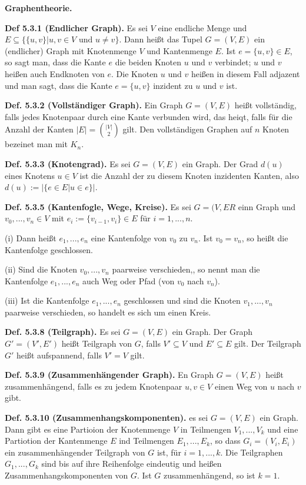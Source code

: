 \textbf{Graphentheorie.}

\textbf{Def 5.3.1 (Endlicher Graph).} Es sei $V$ eine endliche Menge und $E \subseteq \{\{u,v\} \vert u,v \in V \text{ und } u \neq v \}$. Dann heißt das Tupel $G= (V,E)$ ein (endlicher) Graph mit Knotenmenge $V$ und Kantenmenge $E$. Ist $e= \{u,v\} \in E$, so sagt man, dass die Kante $e$ die beiden Knoten $u$ und $v$ verbindet; $u$ und $v$ heißen auch Endknoten von $e$. Die Knoten $u$ und $v$ heißen in diesem Fall adjazent und man sagt, dass die Kante $e= \{u,v\}$ inzident zu $u$ und $v$ ist.

\textbf{Def. 5.3.2 (Vollständiger Graph).} Ein Graph $G=(V,E)$ heißt vollständig, falls jedes Knotenpaar durch eine Kante verbunden wird, das heiqt, falls für die Anzahl der Kanten $\vert E \vert = \binom{\vert V \vert}{2}$ gilt. Den vollständigen Graphen auf $n$ Knoten bezeinet man mit $K_n$.

\textbf{Def. 5.3.3 (Knotengrad).} Es sei $G= (V,E)$ ein Graph. Der Grad $d(u)$ eines Knotens $u\in V$ ist die Anzahl der zu diesem Knoten inzidenten Kanten, also $d(u) := \vert \{ e \in  E \vert u \in e \} \vert$.

\textbf{Def. 5.3.5 (Kantenfogle, Wege, Kreise).} Es sei $ G= (V,ER$ einn Graph und $v_0, ... , v_n \in V$ mit $e_i := \{ v_{i-1}, v_i\} \in E$ für $i=1,...,n$.

(i) Dann heißt $e_1, ...,e_n$ eine Kantenfolge von $v_0$ zu $v_n$. Ist $v_0 = v_n$, so heißt die Kantenfolge geschlossen.

(ii) Sind die Knoten $v_0,...,v_n$ paarweise verschieden,, so nennt man die Kantenfolge $e_1,...,e_n$ auch Weg oder Pfad (von $v_0$ nach $v_n$).

(iii) Ist die Kantenfolge $e_1, ...,e_n$ geschlossen und sind die Knoten $v_1,...,v_n$ paarweise verschieden, so handelt es sich um einen Kreis.

\textbf{Def. 5.3.8 (Teilgraph).} Es sei $G = (V,E)$ ein Graph. Der Graph $G' = (V',E')$ heißt Teilgraph von $G$, falls $V' \subseteq V$ und $E' \subseteq E$ gilt. Der Teilgraph $G'$ heißt aufspannend, falls $V' = V$ gilt.

\textbf{Def. 5.3.9 (Zusammenhängender Graph).} En Graph $G= (V,E)$ heißt zusammenhängend, falls es zu jedem Knotenpaar $u,v\in V$ einen Weg von $u$ nach $v$ gibt.

\textbf{Def. 5.3.10 (Zusammenhangskomponenten).} es sei $G = (V,E)$ ein Graph. Dann gibt es eine Partioion der Knotenmenge $V$ in Teilmengen $V_1,...,V_k$ und eine Partiotion der Kantenmenge $E$ ind Teilmengen $E_1,...,E_k$, so dass $G_i = (V_i,E_i)$ ein zusammenhängender Teilgraph von $G$ ist, für $i = 1,...,k$. Die Teilgraphen $G_1,...,G_k$ sind bis auf ihre Reihenfolge eindeutig und heißen Zusammenhangskomponenten von $G$. Ist $G$ zusammenhängend, so ist $k=1$.

